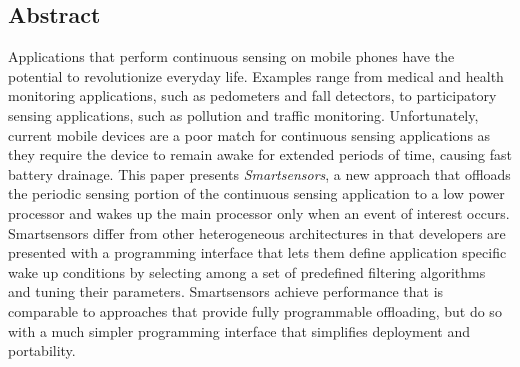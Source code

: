 \subsection*{Abstract}
 
  Applications that perform continuous sensing on mobile phones have
  the potential to revolutionize everyday life.  Examples range from
  medical and health monitoring applications, such as pedometers and
  fall detectors, to participatory sensing applications, such as
  pollution and traffic monitoring.  Unfortunately, current mobile
  devices are a poor match for continuous sensing applications as they
  require the device to remain awake for extended periods of time,
  causing fast battery drainage.  This paper presents {\em
  Smartsensors}\/, a new approach that offloads the periodic sensing
  portion of the continuous sensing application to a low power
  processor and wakes up the main processor only when an event of
  interest occurs.  Smartsensors differ from other heterogeneous
  architectures in that developers are presented with a programming
  interface that lets them define application specific wake up
  conditions by selecting among a set of predefined filtering
  algorithms and tuning their parameters.  Smartsensors achieve
  performance that is comparable to approaches that provide fully
  programmable offloading, but do so with a much simpler programming
  interface that simplifies deployment and portability.

